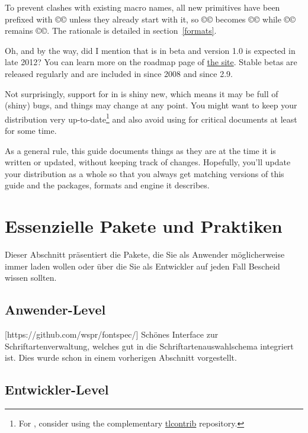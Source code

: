 \documentclass{lltxdoc}
\begin{document}
To prevent clashes with existing macro names, all new primitives
have been prefixed with ©\luatex© unless they already start with it, so
©\luaescapestring© becomes ©\luatexluaescapetring© while ©\luatexversion©
remains ©\luatexversion©. The rationale is detailed in section~\ref{formats}.

\medskip

Oh, and by the way, did I mention that \luatex is in beta and version 1.0 is
expected in late 2012? You can learn more on the roadmap page of
\href{http://luatex.org/}{the \luatex site}. Stable betas are released
regularly and are included in \texlive since 2008 and \miktex since 2.9.

Not surprisingly, support for \luatex in \latex is shiny new, which means it
may be full of (shiny) bugs, and things may change at any point. You might
want to keep your \tex distribution very up-to-date\footnote{For \texlive,
  consider using the complementary
  \href{http://tlcontrib.metatex.org/} {tlcontrib} repository.} and also avoid
using \lualatex for critical documents at least for some time.

As a general rule, this guide documents things as they are at the time it is
written or updated, without keeping track of changes. Hopefully, you'll update
your distribution as a whole so that you always get matching versions of this
guide and the packages, formats and engine it describes.

\section{Essenzielle Pakete und Praktiken}\label{essential}

Dieser Abschnitt präsentiert die Pakete, die Sie als Anwender möglicherweise 
immer laden wollen oder über die Sie als Entwickler auf jeden Fall Bescheid 
wissen sollten.

\subsection{Anwender-Level}

[https://github.com/wspr/fontspec/]
Schönes Interface zur Schriftartenverwaltung, welches gut in die \latex 
Schriftartenauswahlschema integriert ist. Dies wurde schon in einem vorherigen 
Abschnitt vorgestellt.

\subsection{Entwickler-Level}
\end{document}

